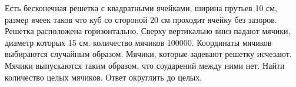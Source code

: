 
Есть бесконечная решетка с квадратными ячейками, ширина прутьев 10 см, размер ячеек таков что куб со стороной 20 см проходит ячейку без зазоров. Решетка  расположена горизонтально. Сверху вертикально вниз падают мячики, диаметр которых 15 см. количество мячиков 100000. Координаты мячиков выбираются случайным образом. Мячики, которые задевают решетку исчезают.  Мячики выпускаются таким образом, что соударений между ними нет. Найти количество целых мячиков. Ответ округлить до целых.